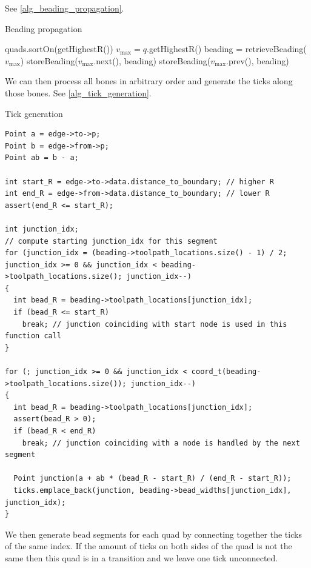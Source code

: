 See \cref{alg_beading_propagation}.

\begin{algorithm}
\caption{Beading propagation}
\label{alg_beading_propagation}
\begin{algorithmic}
\State quads.sortOn(getHighestR())
	\State $v_\text{max} = q$.getHighestR()
	\State beading = retrieveBeading($v_\text{max}$)
		\State storeBeading($v_\text{max}$.next(), beading)
	\EndIf
		\State storeBeading($v_\text{max}$.prev(), beading)
	\EndIf
\EndFor
\end{algorithmic}
\end{algorithm}


We can then process all bones in arbitrary order and generate the ticks along those bones.
See \cref{alg_tick_generation}.

\begin{algorithm}
\caption{Tick generation}
\label{alg_tick_generation}
\lstset{language=C++}
\begin{lstlisting}[frame=single]
Point a = edge->to->p;
Point b = edge->from->p;
Point ab = b - a;

int start_R = edge->to->data.distance_to_boundary; // higher R
int end_R = edge->from->data.distance_to_boundary; // lower R
assert(end_R <= start_R);

int junction_idx;
// compute starting junction_idx for this segment
for (junction_idx = (beading->toolpath_locations.size() - 1) / 2; junction_idx >= 0 && junction_idx < beading->toolpath_locations.size(); junction_idx--)
{
  int bead_R = beading->toolpath_locations[junction_idx];
  if (bead_R <= start_R)
    break; // junction coinciding with start node is used in this function call
}

for (; junction_idx >= 0 && junction_idx < coord_t(beading->toolpath_locations.size()); junction_idx--)
{
  int bead_R = beading->toolpath_locations[junction_idx];
  assert(bead_R > 0);
  if (bead_R < end_R)
    break; // junction coinciding with a node is handled by the next segment
  
  Point junction(a + ab * (bead_R - start_R) / (end_R - start_R));
  ticks.emplace_back(junction, beading->bead_widths[junction_idx], junction_idx);
}
\end{lstlisting}
\end{algorithm}


We then generate bead segments for each quad by connecting together the ticks of the same index.
If the amount of ticks on both sides of the quad is not the same then this quad is in a transition and we leave one tick unconnected.


